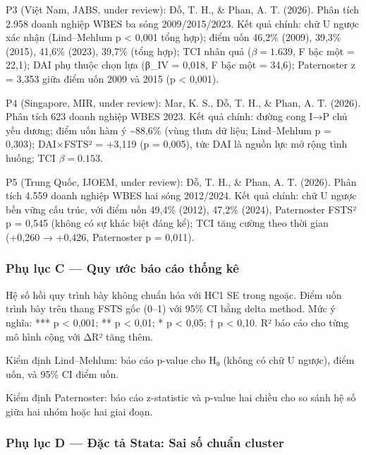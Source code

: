 \documentclass[12pt,a4paper]{article}
\begin{document}
P3 (Việt Nam, JABS, under review): Đỗ, T. H., \& Phan, A. T. (2026).
Phân tích 2.958 doanh nghiệp WBES ba sóng 2009/2015/2023. Kết quả chính:
chữ U ngược xác nhận (Lind--Mehlum p \textless{} 0,001 tổng hợp); điểm
uốn 46,2\% (2009), 39,3\% (2015), 41,6\% (2023), 39,7\% (tổng hợp); TCI
nhân quả (\(\beta = 1.639\), F bậc một = 22,1); DAI phụ thuộc chọn lựa
(β\_IV = 0,018, F bậc một = 34,6); Paternoster z = 3,353 giữa điểm uốn
2009 và 2015 (p \textless{} 0,001).

P4 (Singapore, MIR, under review): Mar, K. S., Đỗ, T. H., \& Phan, A. T.
(2026). Phân tích 623 doanh nghiệp WBES 2023. Kết quả chính: đường cong
I→P chủ yếu dương; điểm uốn hàm ý \textasciitilde88,6\% (vùng thưa dữ
liệu; Lind--Mehlum p = 0,303); DAI×FSTS² = +3,119 (p = 0,005), tức DAI
là nguồn lực mở rộng tình huống; TCI \(\beta = 0.153\).

P5 (Trung Quốc, IJOEM, under review): Đỗ, T. H., \& Phan, A. T. (2026).
Phân tích 4.559 doanh nghiệp WBES hai sóng 2012/2024. Kết quả chính: chữ
U ngược bền vững cấu trúc, với điểm uốn 49,4\% (2012), 47,2\% (2024),
Paternoster FSTS² p = 0,545 (không có sự khác biệt đáng kể); TCI tăng
cường theo thời gian (+0,260 → +0,426, Paternoster p = 0,011).

\hypertarget{phux1ee5-lux1ee5c-c--quy-ux1b0ux1edbc-buxe1o-cuxe1o-thux1ed1ng-kuxea}{%
\subsubsection{Phụ lục C --- Quy ước báo cáo thống
kê}\label{phux1ee5-lux1ee5c-c--quy-ux1b0ux1edbc-buxe1o-cuxe1o-thux1ed1ng-kuxea}}

Hệ số hồi quy trình bày không chuẩn hóa với HC1 SE trong ngoặc. Điểm uốn
trình bày trên thang FSTS gốc (0--1) với 95\% CI bằng delta method. Mức
ý nghĩa: *** p \textless{} 0,001; ** p \textless{} 0,01; * p \textless{}
0,05; † p \textless{} 0,10. R² báo cáo cho từng mô hình cộng với ΔR²
tăng thêm.

Kiểm định Lind--Mehlum: báo cáo p-value cho H₀ (không có chữ U ngược),
điểm uốn, và 95\% CI điểm uốn.

Kiểm định Paternoster: báo cáo z-statistic và p-value hai chiều cho so
sánh hệ số giữa hai nhóm hoặc hai giai đoạn.

\hypertarget{phux1ee5-lux1ee5c-d--ux111ux1eb7c-tux1ea3-stata-sai-sux1ed1-chuux1ea9n-cluster}{%
\subsubsection{Phụ lục D --- Đặc tả Stata: Sai số chuẩn
cluster}\label{phux1ee5-lux1ee5c-d--ux111ux1eb7c-tux1ea3-stata-sai-sux1ed1-chuux1ea9n-cluster}}
\end{document}
